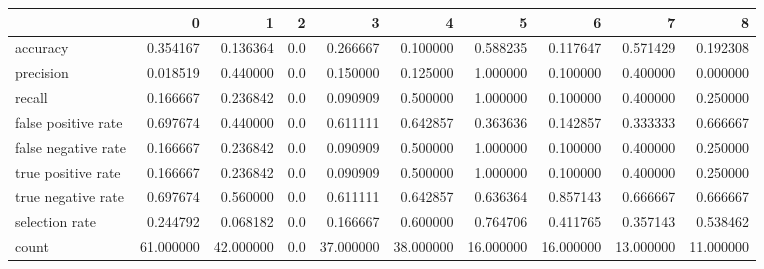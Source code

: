 \begin{tabular}{lrrrrrrrrr}
\toprule
{} &          0 &          1 &    2 &          3 &          4 &          5 &          6 &          7 &          8 \\
\midrule
accuracy            &   0.354167 &   0.136364 &  0.0 &   0.266667 &   0.100000 &   0.588235 &   0.117647 &   0.571429 &   0.192308 \\
precision           &   0.018519 &   0.440000 &  0.0 &   0.150000 &   0.125000 &   1.000000 &   0.100000 &   0.400000 &   0.000000 \\
recall              &   0.166667 &   0.236842 &  0.0 &   0.090909 &   0.500000 &   1.000000 &   0.100000 &   0.400000 &   0.250000 \\
false positive rate &   0.697674 &   0.440000 &  0.0 &   0.611111 &   0.642857 &   0.363636 &   0.142857 &   0.333333 &   0.666667 \\
false negative rate &   0.166667 &   0.236842 &  0.0 &   0.090909 &   0.500000 &   1.000000 &   0.100000 &   0.400000 &   0.250000 \\
true positive rate  &   0.166667 &   0.236842 &  0.0 &   0.090909 &   0.500000 &   1.000000 &   0.100000 &   0.400000 &   0.250000 \\
true negative rate  &   0.697674 &   0.560000 &  0.0 &   0.611111 &   0.642857 &   0.636364 &   0.857143 &   0.666667 &   0.666667 \\
selection rate      &   0.244792 &   0.068182 &  0.0 &   0.166667 &   0.600000 &   0.764706 &   0.411765 &   0.357143 &   0.538462 \\
count               &  61.000000 &  42.000000 &  0.0 &  37.000000 &  38.000000 &  16.000000 &  16.000000 &  13.000000 &  11.000000 \\
\bottomrule
\end{tabular}
